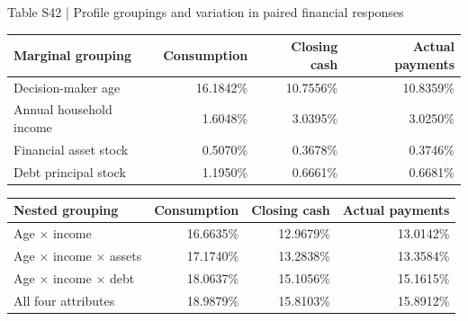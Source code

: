 \documentclass[10pt]{article}
\begin{document}
\begin{center}
\begin{minipage}{\textwidth}
\fontsize{8}{9.8}\selectfont
Table S42 | Profile groupings and variation in paired financial responses
\par\vspace{4pt}
\begin{tabularx}{\textwidth}{@{}Xrrr@{}}
\toprule
Marginal grouping & Consumption & Closing cash & Actual payments \\
\midrule
Decision-maker age & 16.1842\% & 10.7556\% & 10.8359\% \\
Annual household income & 1.6048\% & 3.0395\% & 3.0250\% \\
Financial asset stock & 0.5070\% & 0.3678\% & 0.3746\% \\
Debt principal stock & 1.1950\% & 0.6661\% & 0.6681\% \\

\bottomrule
\end{tabularx}
\par\vspace{8pt}
\begin{tabularx}{\textwidth}{@{}Xrrr@{}}
\toprule
Nested grouping & Consumption & Closing cash & Actual payments \\
\midrule
Age $\times$ income & 16.6635\% & 12.9679\% & 13.0142\% \\
Age $\times$ income $\times$ assets & 17.1740\% & 13.2838\% & 13.3584\% \\
Age $\times$ income $\times$ debt & 18.0637\% & 15.1056\% & 15.1615\% \\
All four attributes & 18.9879\% & 15.8103\% & 15.8912\% \\

\bottomrule
\end{tabularx}
\par{}
\end{minipage}
\end{center}
\end{document}
